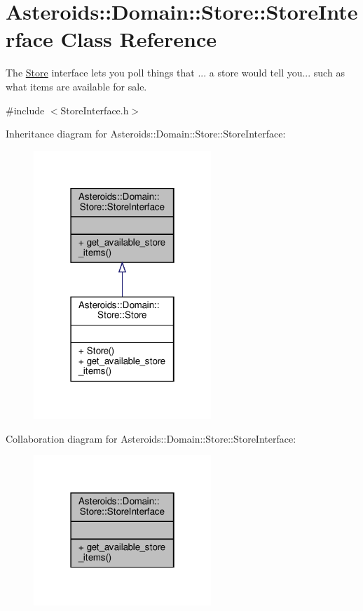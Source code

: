 \hypertarget{classAsteroids_1_1Domain_1_1Store_1_1StoreInterface}{}\section{Asteroids\+:\+:Domain\+:\+:Store\+:\+:Store\+Interface Class Reference}
\label{classAsteroids_1_1Domain_1_1Store_1_1StoreInterface}


The \hyperlink{classAsteroids_1_1Domain_1_1Store_1_1Store}{Store} interface lets you poll things that ... a store would tell you... such as what items are available for sale.  




{\ttfamily \#include $<$Store\+Interface.\+h$>$}



Inheritance diagram for Asteroids\+:\+:Domain\+:\+:Store\+:\+:Store\+Interface\+:\nopagebreak
\begin{figure}[H]
\begin{center}
\leavevmode
\includegraphics[width=190pt]{classAsteroids_1_1Domain_1_1Store_1_1StoreInterface__inherit__graph}
\end{center}
\end{figure}


Collaboration diagram for Asteroids\+:\+:Domain\+:\+:Store\+:\+:Store\+Interface\+:\nopagebreak
\begin{figure}[H]
\begin{center}
\leavevmode
\includegraphics[width=190pt]{classAsteroids_1_1Domain_1_1Store_1_1StoreInterface__coll__graph}
\end{center}
\end{figure}

